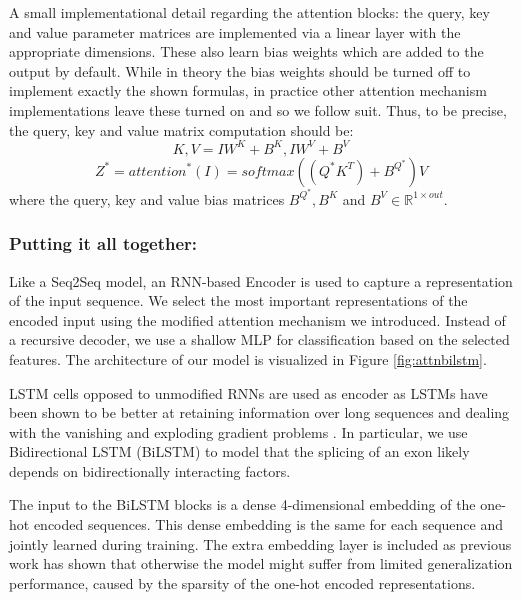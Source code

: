 A small implementational detail regarding the attention blocks: the query, key and value parameter matrices are implemented via a linear layer with the appropriate dimensions. These also learn bias weights which are added to the output by default. While in theory the bias weights should be turned off to implement exactly the shown formulas, in practice other attention mechanism implementations leave these turned on \cite{annotatedtransformer} and so we follow suit. Thus, to be precise, the query, key and value matrix computation should be:
$$K, V = IW^K + B^K, IW^V + B^V$$
$$Z^* = {attention}^*(I) = softmax(({Q}^*K^T)+B^{Q^*})V$$
where the query, key and value bias matrices $B^{Q^*}, B^K$ and $B^V \in \mathbb{R}^{1 \times out}$.
\subsubsection{Putting it all together:} 
Like a Seq2Seq model, an RNN-based Encoder is used to capture a representation of the input sequence. We select the most important representations of the encoded input using the modified attention mechanism we introduced. Instead of a recursive decoder, we use a shallow MLP for classification based on the selected features. The architecture of our model is visualized in Figure \ref{fig:attnbilstm}.

LSTM cells opposed to unmodified RNNs are used as encoder as LSTMs have been shown to be better at retaining information over long sequences and dealing with the vanishing and exploding gradient problems \cite{lstm}. In particular, we use Bidirectional LSTM (BiLSTM) \cite{bidirection} to model that the splicing of an exon likely depends on bidirectionally interacting factors.

The input to the BiLSTM blocks is a dense 4-dimensional embedding of the one-hot encoded sequences. This dense embedding is the same for each sequence and jointly learned during training. The extra embedding layer is included as previous work \cite{embeddingneeded} has shown that otherwise the model might suffer from limited generalization performance, caused by the sparsity of the one-hot encoded representations. 

